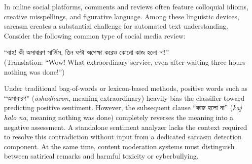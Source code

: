 \documentclass[11pt,a4paper]{article}
\newcommand{\bn}[1]{{\bengalifont #1}}
\newcommand{\bn}[1]{#1}
\begin{document}
In online social platforms, comments and reviews often feature colloquial idioms, creative misspellings, and figurative language. Among these linguistic devices, sarcasm creates a substantial challenge for automated text understanding. Consider the following common type of social media review:
\begin{center}
\bn{“বাহ! কী অসাধারণ সার্ভিস, তিন ঘণ্টা অপেক্ষা করেও কোনো কাজ হলো না!”} \\
\small{(Translation: ``Wow! What extraordinary service, even after waiting three hours nothing was done!'')}
\end{center}

Under traditional bag-of-words or lexicon-based methods, positive words such as \bn{“অসাধারণ”} (\textit{oshadharon}, meaning extraordinary) heavily bias the classifier toward predicting positive sentiment. However, the subsequent clause \bn{“কাজ হলো না”} (\textit{kaj holo na}, meaning nothing was done) completely reverses the meaning into a negative assessment. A standalone sentiment analyzer lacks the context required to resolve this contradiction without input from a dedicated sarcasm detection component. At the same time, content moderation systems must distinguish between satirical remarks and harmful toxicity or cyberbullying.
\end{document}
